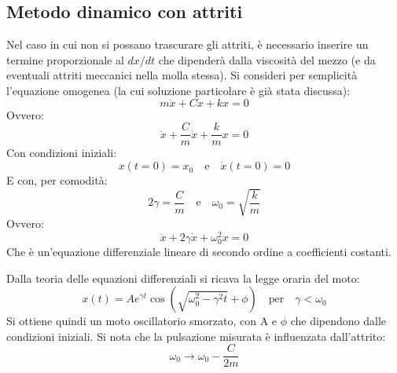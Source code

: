 \documentclass[a4paper,12pt]{article}
\begin{document}
\subsection{Metodo dinamico con attriti}
Nel caso in cui non si possano trascurare gli attriti, è necessario inserire un termine proporzionale al
$dx/dt$ che dipenderà dalla viscosità del mezzo (e da eventuali attriti meccanici nella molla stessa).
Si consideri per semplicità l'equazione omogenea (la cui soluzione particolare è già stata discussa):
$$
m\ddot{x} + C\dot{x} + kx = 0
$$
Ovvero:
$$
\ddot{x} + \frac{C}{m} \dot{x} + \frac{k}{m} x = 0
$$
Con condizioni iniziali:
$$
x(t=0) = x_0 \quad \text{e} \quad \dot{x}(t=0) = 0
$$
E con, per comodità:
$$
2\gamma = \frac{C}{m} \quad \text{e} \quad \omega_0 = \sqrt{\frac{k}{m}}
$$
Ovvero:
$$
\ddot{x} + 2\gamma \dot{x} + \omega_0^2 x = 0
$$
Che è un'equazione differenziale lineare di secondo ordine a coefficienti costanti.

Dalla teoria delle equazioni differenziali si ricava la legge oraria del moto:
$$
x(t) = A e^{\gamma t} \cos(\sqrt{\omega_0^2 - \gamma^2 t} + \phi) \quad \text{per} \quad \gamma < \omega_0
$$
Si ottiene quindi un moto oscillatorio smorzato, con A e $\phi$ che dipendono dalle condizioni iniziali.
Si nota che la pulsazione misurata è influenzata dall'attrito:
$$
\omega_0 \to \omega_0 - \frac{C}{2m}
$$

\newpage
\end{document}
